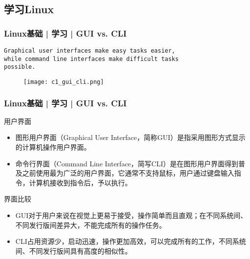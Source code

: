 \subsection{学习Linux}
\begin{frame}[fragile]
  \frametitle{Linux基础 | 学习 | GUI vs. CLI}
  \begin{verbatim}
Graphical user interfaces make easy tasks easier,
while command line interfaces make difficult tasks
possible.
  \end{verbatim}
  \vspace{-0.8cm}
  \begin{figure}
    \centering
    \texttt{[image: c1\_gui\_cli.png]}
  \end{figure}
\end{frame}

\begin{frame}
  \frametitle{Linux基础 | 学习 | GUI vs. CLI}
  \begin{block}{\alert{用户界面}}
    \begin{itemize}[<+->]
      \item 图形用户界面（Graphical User Interface，简称GUI）是指采用图形方式显示的计算机操作用户界面。
      \item 命令行界面（Command Line Interface，简写CLI）是在图形用户界面得到普及之前使用最为广泛的用户界面，它通常不支持鼠标，用户通过键盘输入指令，计算机接收到指令后，予以执行。
    \end{itemize}
  \end{block}
  \pause
  \begin{block}{界面比较}
    \begin{itemize}
      \item GUI对于用户来说在视觉上更易于接受，操作简单而且直观；在不同系统间、不同发行版间差异大，不能完成所有的操作任务。
      \item CLI占用资源少，启动迅速，操作更加高效，可以完成所有的工作，不同系统间、不同发行版间具有高度的相似性。
    \end{itemize}
  \end{block}
  \pause
\end{frame}

